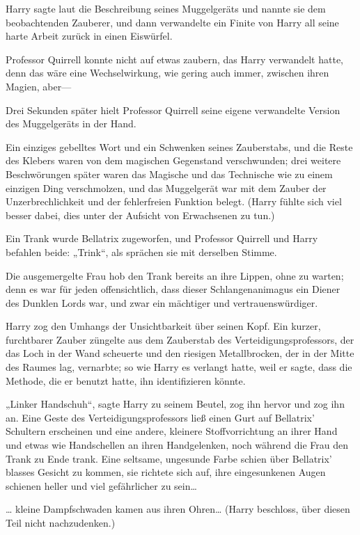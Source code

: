 {Harry sagte laut die Beschreibung seines Muggelgeräts und nannte sie dem beobachtenden Zauberer, und dann verwandelte ein Finite von Harry all seine harte Arbeit zurück in einen Eiswürfel.

Professor Quirrell konnte nicht auf etwas zaubern, das Harry verwandelt hatte, denn das wäre eine Wechselwirkung, wie gering auch immer, zwischen ihren Magien, aber—

Drei Sekunden später hielt Professor Quirrell seine eigene verwandelte Version des Muggelgeräts in der Hand.

Ein einziges gebelltes Wort und ein Schwenken seines Zauberstabs, und die Reste des Klebers waren von dem magischen Gegenstand verschwunden; drei weitere Beschwörungen später waren das Magische und das Technische wie zu einem einzigen Ding verschmolzen, und das Muggelgerät war mit dem Zauber der Unzerbrechlichkeit und der fehlerfreien Funktion belegt. (Harry fühlte sich viel besser dabei, dies unter der Aufsicht von Erwachsenen zu tun.)

Ein Trank wurde Bellatrix zugeworfen, und Professor Quirrell und Harry befahlen beide: „Trink“, als sprächen sie mit derselben Stimme.

Die ausgemergelte Frau hob den Trank bereits an ihre Lippen, ohne zu warten; denn es war für jeden offensichtlich, dass dieser Schlangenanimagus ein Diener des Dunklen Lords war, und zwar ein mächtiger und vertrauenswürdiger.

Harry zog den Umhangs der Unsichtbarkeit über seinen Kopf. Ein kurzer, furchtbarer Zauber züngelte aus dem Zauberstab des Verteidigungsprofessors, der das Loch in der Wand scheuerte und den riesigen Metallbrocken, der in der Mitte des Raumes lag, vernarbte; so wie Harry es verlangt hatte, weil er sagte, dass die Methode, die er benutzt hatte, ihn identifizieren könnte.

„Linker Handschuh“, sagte Harry zu seinem Beutel, zog ihn hervor und zog ihn an. Eine Geste des Verteidigungsprofessors ließ einen Gurt auf Bellatrix' Schultern erscheinen und eine andere, kleinere Stoffvorrichtung an ihrer Hand und etwas wie Handschellen an ihren Handgelenken, noch während die Frau den Trank zu Ende trank. Eine seltsame, ungesunde Farbe schien über Bellatrix' blasses Gesicht zu kommen, sie richtete sich auf, ihre eingesunkenen Augen schienen heller und viel gefährlicher zu sein…

… kleine Dampfschwaden kamen aus ihren Ohren… (Harry beschloss, über diesen Teil nicht nachzudenken.)

}
